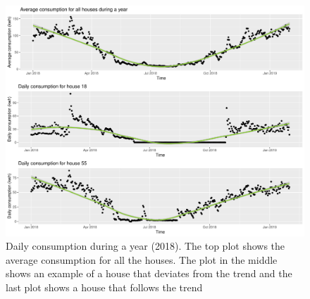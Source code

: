 \begin{figure}
    \centering
    \includegraphics[width=1.\textwidth]{../../../figures/avg_daily.pdf}
    \caption{Daily consumption during a year (2018). The top plot shows the average consumption for all the houses. The plot in the middle shows an example of a house that deviates from the trend and the last plot shows a house that follows the trend}
    \label{fig: daily_cons}
\end{figure}

